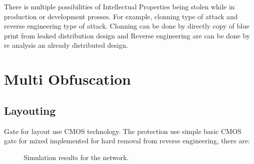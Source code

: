 \documentclass[10pt,journal,compsoc,letterpaper,final]{IEEEtran}
\begin{document}
There is multiple possibilities of Intellectual Properties being stolen while in production or development prosses. For example, clonning type of attack and reverse engineering type of attack. Clonning can be done by directly copy of blue print from leaked distribution design and Reverse engineering are can be done by re analysis an already distributed design.

\section{Multi Obfuscation}

\subsection{Layouting}
Gate for layout use CMOS technology. The protection use simple basic CMOS gate for mixed implemented for hard removal from reverse engineering, there are:
\begin{figure}[h]
	\centering
	\hfil
	\hfil
	\caption{Simulation results for the network.}
	\label{fig_sim}
\end{figure}
\end{document}
